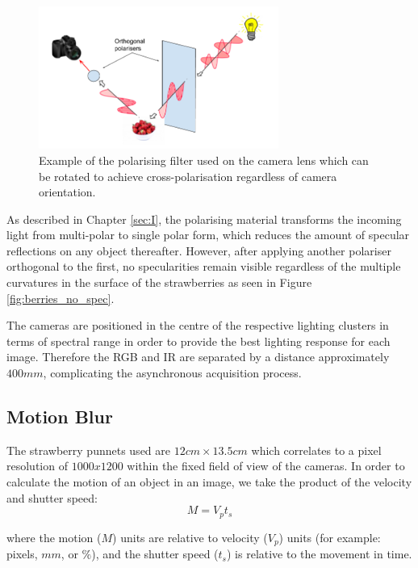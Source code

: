 \documentclass[fleqn,twoside,12pt]{report}
\begin{document}
\begin{figure}[h]
	\centering
	\includegraphics[width=0.7\textwidth]{cross-polariser.png}
	\caption{Example of the polarising filter used on the camera lens which can be rotated to achieve cross-polarisation regardless of camera orientation.}
	\label{fig:nd_filters}
\end{figure}

As described in Chapter \ref{sec:I}, the polarising material transforms the incoming light from multi-polar to single polar form, which reduces the amount of specular reflections on any object thereafter. However, after applying another polariser orthogonal to the first, no specularities remain visible regardless of the multiple curvatures in the surface of the strawberries as seen in Figure \ref{fig:berries_no_spec}. 


The cameras are positioned in the centre of the respective lighting clusters in terms of spectral range in order to provide the best lighting response for each image. Therefore the RGB and IR are separated by a distance approximately $400mm$, complicating the asynchronous acquisition process.



\subsection{Motion Blur} 

The strawberry punnets used are $12cm\times 13.5cm$ which correlates to a pixel resolution of $1000x1200$ within the fixed field of view of the cameras. In order to calculate the motion of an object in an image, we take the product of the velocity and shutter speed:
\begin{equation}
M = V_p t_s
\label{eq:motion}
\end{equation}  

where the motion ($M$) units are relative to velocity ($V_p$) units (for example: pixels, $mm$, or $\%$), and the shutter speed ($t_s$) is relative to the movement in time. 
\end{document}
